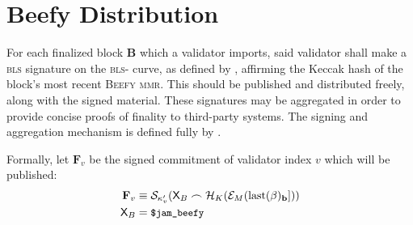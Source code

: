\section{Beefy Distribution}\label{sec:beefy}

For each finalized block $\mathbf{B}$ which a validator imports, said validator shall make a \textsc{bls} signature on the \textsc{bls}- curve, as defined by \cite{bls12-381}, affirming the Keccak hash of the block's most recent \textsc{Beefy} \textsc{mmr}. This should be published and distributed freely, along with the signed material. These signatures may be aggregated in order to provide concise proofs of finality to third-party systems. The signing and aggregation mechanism is defined fully by \cite{cryptoeprint:2022/1611}.

Formally, let $\mathbf{F}_v$ be the signed commitment of validator index $v$ which will be published:
\begin{align}\label{eq:beefysignedcommitment}
  \mathbf{F}_v &\equiv \mathcal{S}_{\kappa'_v}(\mathsf{X}_B\frown\mathcal{H}_K(\mathcal{E}_M(\text{last}(\beta)_\mathbf{b}]))\\
  \mathsf{X}_B &= \text{{\small \texttt{\$jam\_beefy}}}
\end{align}
